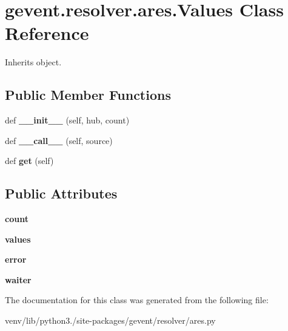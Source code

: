 \hypertarget{classgevent_1_1resolver_1_1ares_1_1_values}{}\section{gevent.\+resolver.\+ares.\+Values Class Reference}
\label{classgevent_1_1resolver_1_1ares_1_1_values}


Inherits object.

\subsection*{Public Member Functions}
\begin{DoxyCompactItemize}
\item 
\mbox{\label{classgevent_1_1resolver_1_1ares_1_1_values_a8f646092e1fe11b5cdf28835b0d152e2}} 
def {\bfseries \+\_\+\+\_\+init\+\_\+\+\_\+} (self, hub, count)
\item 
\mbox{\label{classgevent_1_1resolver_1_1ares_1_1_values_a49a2b03b57b30f6b615fb27d7ae80ef6}} 
def {\bfseries \+\_\+\+\_\+call\+\_\+\+\_\+} (self, source)
\item 
\mbox{\label{classgevent_1_1resolver_1_1ares_1_1_values_aed57333fd20e0141371483d5b6ec85ad}} 
def {\bfseries get} (self)
\end{DoxyCompactItemize}
\subsection*{Public Attributes}
\begin{DoxyCompactItemize}
\item 
\mbox{\label{classgevent_1_1resolver_1_1ares_1_1_values_ab0fd3c517065b39f863c18b4b27681e1}} 
{\bfseries count}
\item 
\mbox{\label{classgevent_1_1resolver_1_1ares_1_1_values_a61eb5cc722bc6ad7aa672a28233e9530}} 
{\bfseries values}
\item 
\mbox{\label{classgevent_1_1resolver_1_1ares_1_1_values_a8ef41b606fcfc5566949fd87bdeb5256}} 
{\bfseries error}
\item 
\mbox{\label{classgevent_1_1resolver_1_1ares_1_1_values_a1761695e45154ba1740d9847ae5b63a8}} 
{\bfseries waiter}
\end{DoxyCompactItemize}


The documentation for this class was generated from the following file\+:\begin{DoxyCompactItemize}
\item 
venv/lib/python3./site-\/packages/gevent/resolver/ares.\+py\end{DoxyCompactItemize}
